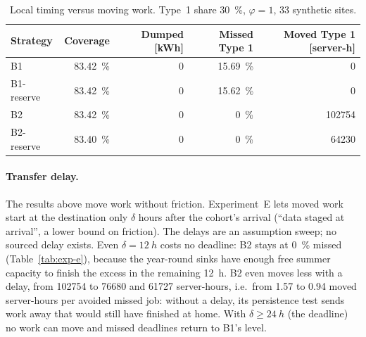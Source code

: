 \begin{table}[ht]
  \centering
  \caption{Local timing versus moving work.
    Type~1 share \qty{30}{\percent}, $\varphi=1$, 33 synthetic sites.}
  \label{tab:reserve}
  \begin{tabular}{lrrrr}
    \toprule
    Strategy & Coverage & Dumped [kWh] & Missed Type 1 & Moved Type 1 [server-h] \\
    \midrule
    B1 & \qty{83.42}{\percent} & 0 & \qty{15.69}{\percent} & 0 \\
    B1-reserve & \qty{83.42}{\percent} & 0 & \qty{15.62}{\percent} & 0 \\
    B2 & \qty{83.42}{\percent} & 0 & \qty{0}{\percent} & \num{102754} \\
    B2-reserve & \qty{83.40}{\percent} & 0 & \qty{0}{\percent} & \num{64230} \\
    \bottomrule
  \end{tabular}
\end{table}

\paragraph{Transfer delay.} The results above move work without friction. Experiment~E
lets moved work start at the destination only $\delta$ hours after the cohort's
arrival (``data staged at arrival'', a lower bound on friction). The delays are an assumption
sweep; no sourced delay exists. Even $\delta = \qty{12}{h}$ costs no deadline: B2 stays at
\qty{0}{\percent} missed (Table~\ref{tab:exp-e}), because the year-round sinks have enough free
summer capacity to finish the excess in the remaining \qty{12}{h}. B2 even moves less with a delay,
from \num{102754} to \num{76680} and \num{61727} server-hours, i.e.\ from 1.57 to 0.94 moved
server-hours per avoided missed job: without a delay, its persistence test sends work away that would
still have finished at home. With $\delta \ge \qty{24}{h}$ (the deadline) no work can move and missed
deadlines return to B1's level.

